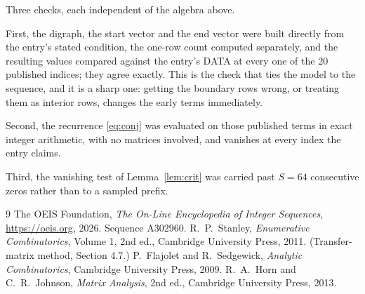 \documentclass[11pt,a4paper]{article}
\theoremstyle{plain}
\theoremstyle{definition}
\begin{document}
Three checks, each independent of the algebra above.

First, the digraph, the start vector and the end vector were built directly from the
entry's stated condition, the one-row count computed separately, and the resulting values
compared against the entry's DATA at every one of the $20$ published indices; they
agree exactly. This is the check that ties the model to the sequence, and it is a sharp one:
getting the boundary rows wrong, or treating them as interior rows, changes the early terms
immediately.

Second, the recurrence \eqref{eq:conj} was evaluated on those published terms in exact
integer arithmetic, with no matrices involved, and vanishes at every index the entry claims.

Third, the vanishing test of Lemma~\ref{lem:crit} was carried past $S=64$ consecutive
zeros rather than to a sampled prefix.

\begin{thebibliography}{9}
 The OEIS Foundation, \emph{The On-Line Encyclopedia of Integer
Sequences}, \url{https://oeis.org}, 2026. Sequence A302960.
 R.~P.~Stanley, \emph{Enumerative Combinatorics}, Volume 1, 2nd ed.,
Cambridge University Press, 2011. (Transfer-matrix method, Section 4.7.)
 P.~Flajolet and R.~Sedgewick, \emph{Analytic Combinatorics}, Cambridge
University Press, 2009.
 R.~A.~Horn and C.~R.~Johnson, \emph{Matrix Analysis}, 2nd ed., Cambridge
University Press, 2013.
\end{thebibliography}
\end{document}
